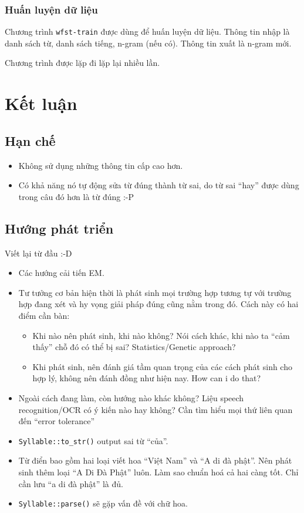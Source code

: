 \documentclass[a4paper,oneside]{book} %
\begin{document}
\subsection{Huấn luyện dữ liệu}
\label{sub:training-data}

Chương trình \verb#wfst-train# được dùng để huấn luyện dữ liệu. Thông
tin nhập là danh sách từ, danh sách tiếng, n-gram (nếu có). Thông tin
xuất là n-gram mới.

Chương trình được lặp đi lặp lại nhiều lần.


\chapter{Kết luận}
\label{cha:conclusion}

\section{Hạn chế}
\begin{itemize}
\item Không sử dụng những thông tin cấp cao hơn.
\item Có khả năng nó tự động sửa từ đúng thành từ sai, do từ sai
  ``hay'' được dùng trong câu đó hơn là từ đúng :-P
\end{itemize}

\section{Hướng phát triển}
\label{sec:todo}

Viết lại từ đầu :-D

\begin{itemize}
\item Các hướng cải tiến EM.
\item Tư tưởng cơ bản hiện thời là phát sinh mọi trường hợp tương tự
  với trường hợp đang xét và hy vọng giải pháp đúng cũng nằm trong
  đó. Cách này có hai điểm cần bàn:
  \begin{itemize}
  \item Khi nào nên phát sinh, khi nào không? Nói cách khác, khi nào
    ta ``cảm thấy'' chỗ đó có thể bị sai? Statistics/Genetic approach?
  \item Khi phát sinh, nên đánh giá tầm quan trọng của các cách phát
    sinh  cho hợp lý, không nên đánh đồng như hiện nay. How can i do
    that? 
  \end{itemize}
\item Ngoài cách đang làm, còn hướng nào khác không? Liệu speech
  recognition/OCR có ý kiến nào hay không? Cần tìm hiểu mọi thứ liên
  quan đến ``error tolerance''
\item \verb#Syllable::to_str()# output sai từ ``của''.
\item Từ điển bao gồm hai loại viết hoa ``Việt Nam'' và ``A di đà
  phật''. Nên phát sinh thêm loại ``A Di Đà Phật'' luôn. Làm sao chuẩn
  hoá cả hai càng tốt. Chỉ cần lưu ``a di đà phật'' là đủ.
\item \verb#Syllable::parse()# sẽ gặp vấn đề với chữ hoa.
\end{itemize}
\end{document}
